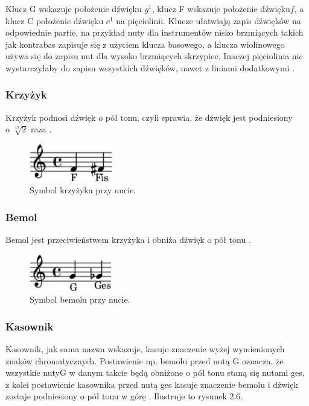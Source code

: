\documentclass[printmode, eng]{mgr}
\newcommand\tab[1][1cm]{\hspace*{#1}}
\begin{document}
\tab Klucz G wskazuje położenie dźwięku $g^{1}$, klucz F wskazuje położenie dźwięku\linebreak$f$, a klucz C położenie dźwięku $c^{1}$ na pięciolinii. Klucze ułatwiają zapis dźwięków na odpowiednie partie, na przykład nuty dla instrumentów nisko brzmiących takich jak kontrabas zapisuje się z użyciem klucza basowego, a klucza wiolinowego używa się do zapisu nut dla wysoko brzmiących skrzypiec. Inaczej pięciolinia nie wystarczyłaby do zapisu wszystkich dźwięków, nawet z liniami dodatkowymi \cite{key}. 

\subsubsection{Krzyżyk}
\tab Krzyżyk podnosi dźwięk o pół tonu, czyli sprawia, że dźwięk jest podniesiony\\o $\sqrt[12]{2}$ raza \cite{slow}. 
\begin{figure}[!htb]
\centering
\includegraphics[width=3.6cm]{krzyzyk.png}
\caption{Symbol krzyżyka przy nucie.}
\end{figure}

\subsubsection{Bemol}
\tab Bemol jest przeciwieństwem krzyżyka i obniża dźwięk o pół tonu \cite{slow}. 
\begin{figure}[!htb]
\centering
\includegraphics[width=3.6cm]{bemol.png}
\caption{Symbol bemolu przy nucie.}
\end{figure}

\subsubsection{Kasownik}
\tab Kasownik, jak sama nazwa wskazuje, kasuje znaczenie wyżej wymienionych znaków chromatycznych. Postawienie np. bemolu przed nutą G oznacza, że wszystkie nuty\linebreak G w danym takcie będą obniżone o pół tonu staną się nutami ges, z kolei postawienie kasownika przed nutą ges kasuje znaczenie bemolu i dźwięk zostaje podniesiony o pół tonu w górę \cite{slow}.  Ilustruje to rysunek 2.6.
\end{document}
